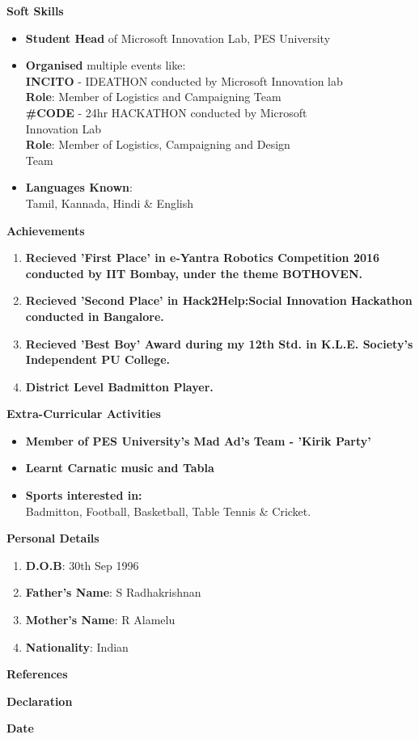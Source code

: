 \documentclass[a4paper,12pt,final]{memoir}
\newcommand{\Sep}{\vspace{1.5em}}
\newcommand{\SmallSep}{\vspace{0.5em}}
\newcommand\tab[1][1cm]{\hspace*{#1}}
\newcommand{\CVSection}[1]
{\Large\textbf{#1}\par
	\SmallSep\normalsize\normalfont}
\begin{document}
	\CVSection{Soft Skills}
		\begin{itemize}
			\item \textbf{Student Head} of Microsoft Innovation Lab, PES University
			\item \textbf{Organised} multiple events like:\\
			\tab \textbf{INCITO} - IDEATHON conducted by Microsoft Innovation lab\\
			\tab \tab \textbf{Role}: Member of Logistics and Campaigning Team\\
			\clearpage
			\framebreak
			\framebreak
			\tab \textbf{\#CODE} - 24hr HACKATHON conducted by Microsoft \\\tab \tab Innovation Lab\\
			\tab \tab \textbf{Role}: Member of Logistics, Campaigning and Design\\\tab \tab Team
			\item \textbf{Languages Known}:\\
			\tab Tamil, Kannada, Hindi \& English
			 
		\end{itemize}
	\Sep
	
	\CVSection{Achievements}
		\begin{enumerate}
			\item \textbf{Recieved 'First Place' in e-Yantra Robotics Competition 2016 conducted by IIT Bombay, under the theme BOTHOVEN.}
			\item \textbf{Recieved 'Second Place' in Hack2Help:Social Innovation Hackathon conducted in Bangalore.}
			\item \textbf{Recieved 'Best Boy' Award during my 12th Std. in K.L.E. Society's Independent PU College.}
			\item \textbf{District Level Badmitton Player.}
		\end{enumerate}
	\Sep
	
	\CVSection{Extra-Curricular Activities}
		\begin{itemize}
			\item \textbf{Member of PES University's Mad Ad's Team - 'Kirik Party'}
			\item \textbf{Learnt Carnatic music and Tabla}
			\item \textbf{Sports interested in:}\\
			\tab Badmitton, Football, Basketball, Table Tennis \& Cricket.
		\end{itemize}
	\Sep
	
	\CVSection{Personal Details}
		\begin{enumerate}
			\item \textbf{D.O.B}: 30th Sep 1996
			\item \textbf{Father's Name}: S Radhakrishnan
			\item \textbf{Mother's Name}: R Alamelu
			\item \textbf{Nationality}: Indian
		\end{enumerate}
	\Sep

	\CVSection{References}
	\Sep
		
	\CVSection{Declaration}
	\Sep
	
	\CVSection{Date}
	\Sep

	
\end{document}

